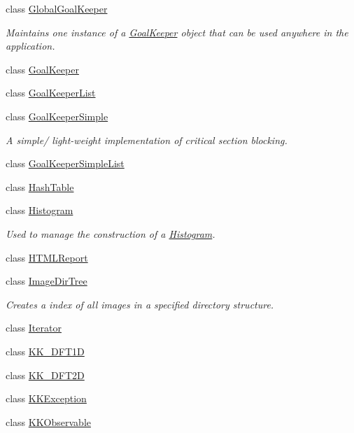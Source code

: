 \begin{DoxyCompactItemize}
class \hyperlink{class_k_k_b_1_1_global_goal_keeper}{Global\+Goal\+Keeper}
\begin{DoxyCompactList}\small\item\em Maintains one instance of a \hyperlink{class_k_k_b_1_1_goal_keeper}{Goal\+Keeper} object that can be used anywhere in the application. \end{DoxyCompactList}\item 
class \hyperlink{class_k_k_b_1_1_goal_keeper}{Goal\+Keeper}
\item 
class \hyperlink{class_k_k_b_1_1_goal_keeper_list}{Goal\+Keeper\+List}
\item 
class \hyperlink{class_k_k_b_1_1_goal_keeper_simple}{Goal\+Keeper\+Simple}
\begin{DoxyCompactList}\small\item\em A simple/ light-\/weight implementation of critical section blocking. \end{DoxyCompactList}\item 
class \hyperlink{class_k_k_b_1_1_goal_keeper_simple_list}{Goal\+Keeper\+Simple\+List}
\item 
class \hyperlink{class_k_k_b_1_1_hash_table}{Hash\+Table}
\item 
class \hyperlink{class_k_k_b_1_1_histogram}{Histogram}
\begin{DoxyCompactList}\small\item\em Used to manage the construction of a \hyperlink{class_k_k_b_1_1_histogram}{Histogram}. \end{DoxyCompactList}\item 
class \hyperlink{class_k_k_b_1_1_h_t_m_l_report}{H\+T\+M\+L\+Report}
\item 
class \hyperlink{class_k_k_b_1_1_image_dir_tree}{Image\+Dir\+Tree}
\begin{DoxyCompactList}\small\item\em Creates a index of all images in a specified directory structure. \end{DoxyCompactList}\item 
class \hyperlink{class_k_k_b_1_1_iterator}{Iterator}
\item 
class \hyperlink{class_k_k_b_1_1_k_k___d_f_t1_d}{K\+K\+\_\+\+D\+F\+T1D}
\item 
class \hyperlink{class_k_k_b_1_1_k_k___d_f_t2_d}{K\+K\+\_\+\+D\+F\+T2D}
\item 
class \hyperlink{class_k_k_b_1_1_k_k_exception}{K\+K\+Exception}
\item 
class \hyperlink{class_k_k_b_1_1_k_k_observable}{K\+K\+Observable}

\end{DoxyCompactItemize}
